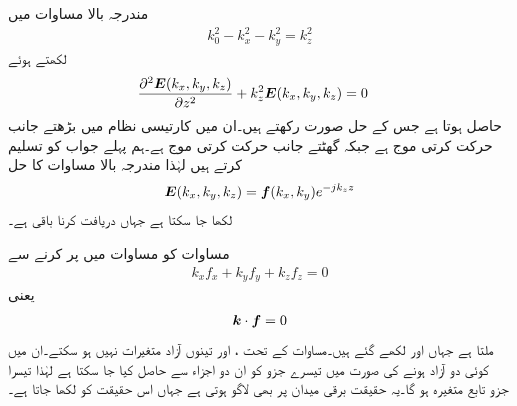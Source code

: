 مندرجہ بالا مساوات میں
\begin{align}\label{مساوات_اینٹینا_حرکی_مستقل_الف}
k_0^2-k_x^2-k_y^2=k_z^2
\end{align}
لکھتے ہوئے
\begin{align}
\frac{\partial^2 {{\boldsymbol{E}}}(k_x,k_y,k_z)}{\partial z^2}+k_z^2{{\boldsymbol{E}}}(k_x,k_y,k_z)&=0
\end{align}
حاصل ہوتا ہے جس کے حل  صورت رکھتے ہیں۔ان میں  کارتیسی نظام میں بڑھتے  جانب حرکت کرتی موج ہے جبکہ  گھٹتے   جانب حرکت کرتی موج ہے۔ہم پہلے جواب کو تسلیم کرتے ہیں لہٰذا مندرجہ بالا مساوات کا حل
\begin{align}\label{مساوات_اینٹینا_فوریئر_ج}
{\ensuremath{{\boldsymbol{E}}}}(k_x,k_y,k_z)={{\boldsymbol{f}}}(k_x,k_y) e^{-j k_z z}
\end{align}
لکھا جا سکتا ہے جہاں  دریافت کرنا باقی ہے۔

مساوات  کو مساوات  میں پر کرنے سے
\begin{align}
k_x f_x+k_y f_y+k_z f_z=0
\end{align}
یعنی
\begin{align}\label{مساوات_اینٹینا_فوریئر_چ}
{\ensuremath{{\boldsymbol{k}}}} \cdot {\ensuremath{{\boldsymbol{f}}}}=0
\end{align}
ملتا ہے جہاں  اور  لکھے گئے ہیں۔مساوات  کے تحت ،  اور  تینوں آزاد متغیرات نہیں ہو سکتے۔ان میں کوئی دو آزاد ہونے کی صورت میں تیسرے جزو کو ان دو اجزاء سے حاصل کیا جا سکتا ہے لہٰذا تیسرا جزو تابع متغیرہ ہو گا۔یہ حقیقت برقی میدان پر بھی لاگو ہوتی ہے  جہاں اس حقیقت کو  لکھا جاتا ہے۔

